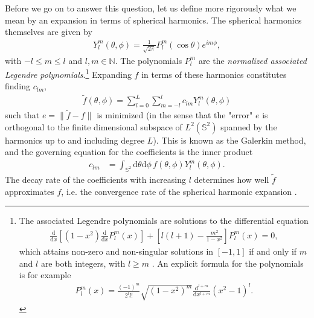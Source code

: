 \documentclass[a4paper]{article}
\newcommand{\der} [2]{\frac{\mathrm{d} #1}{\mathrm{d} #2}}   %
\newcommand{\comment}[1]{\ignorespaces}
\begin{document}
Before we go on to answer this question, let us define more rigorously what we mean by an expansion in terms of spherical harmonics. The spherical harmonics themselves are given by \cite{rottmann}
\begin{align}
Y^m_l(\theta,\phi)=\frac{1}{\sqrt{2\pi}}P^m_l(\cos\theta)e^{im\phi},
\end{align}
with $-l\le m \le l$ and $l,m\in\mathbb{N}$. The polynomials $P^m_l$ are the \emph{normalized associated Legendre polynomials}.\footnote{The associated Legendre polynomials are solutions to the differential equation
\begin{align}
\der{}{x}\left[\left(1-x^2\right)\der{}{x}P^m_l(x)\right]+\left[ l(l+1)-\frac{m^2}{1-x^2} \right]P^m_l(x)=0,
\end{align}
which attains non-zero and non-singular solutions in $[-1,1]$ if and only if $m$ and $l$ are both integers, with $l\ge m$ \cite{rottmann}\comment{p92}. An explicit formula for the polynomials is for example 
\begin{align}
P^m_l(x)=\frac{(-1)^m}{2^ll!}\sqrt{\left(1-x^2\right)^m}\der{^{l+m}}{x^{l+m}}\left(x^2-1\right)^l.
\end{align}
} Expanding $f$ in terms of these harmonics constitutes finding $c_{lm}$,
\begin{align}
\tilde f(\theta,\phi)=\sum_{l=0}^L\sum_{m=-l}^lc_{lm}Y^m_l(\theta,\phi) \label{eq:ftilde}
\end{align}
such that $e=\lVert\tilde f - f \rVert$ is minimized \cite{matinf5620} (in the sense that the "error" $e$ is orthogonal to the finite dimensional subspace of $L^2(\mathbb{S}^2)$ spanned by the harmonics up to and including degree $L$). This is known as the Galerkin method, and the governing equation for the coefficients is the inner product 
\begin{align}
c_{lm}&=\int_{\mathbb{S}^2}\mathrm{d}\theta\mathrm{d}\phi\,f(\theta,\phi)Y^m_l(\theta,\phi).
\end{align}
The decay rate of the coefficients with increasing $l$ determines how well $\tilde f$ approximates $f$, i.e. the convergence rate of the spherical harmonic expansion \cite{beentjes}\comment{p2}.
\end{document}
